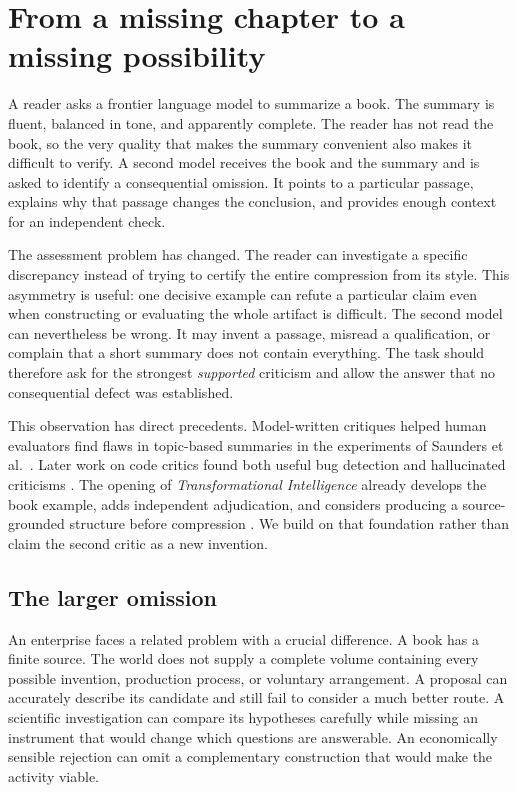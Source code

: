 \section{From a missing chapter to a missing possibility}
\label{sec:opening}
A reader asks a frontier language model to summarize a book. The summary is fluent, balanced in tone, and apparently complete. The reader has not read the book, so the very quality that makes the summary convenient also makes it difficult to verify. A second model receives the book and the summary and is asked to identify a consequential omission. It points to a particular passage, explains why that passage changes the conclusion, and provides enough context for an independent check.

The assessment problem has changed. The reader can investigate a specific discrepancy instead of trying to certify the entire compression from its style. This asymmetry is useful: one decisive example can refute a particular claim even when constructing or evaluating the whole artifact is difficult. The second model can nevertheless be wrong. It may invent a passage, misread a qualification, or complain that a short summary does not contain everything. The task should therefore ask for the strongest \emph{supported} criticism and allow the answer that no consequential defect was established.

This observation has direct precedents. Model-written critiques helped human evaluators find flaws in topic-based summaries in the experiments of Saunders et al.\ \citep{saunders}. Later work on code critics found both useful bug detection and hallucinated criticisms \citep{critic}. The opening of \emph{Transformational Intelligence} already develops the book example, adds independent adjudication, and considers producing a source-grounded structure before compression \citep[\S1 and Appendix C]{boucher_ti}. We build on that foundation rather than claim the second critic as a new invention.

\subsection{The larger omission}
An enterprise faces a related problem with a crucial difference. A book has a finite source. The world does not supply a complete volume containing every possible invention, production process, or voluntary arrangement. A proposal can accurately describe its candidate and still fail to consider a much better route. A scientific investigation can compare its hypotheses carefully while missing an instrument that would change which questions are answerable. An economically sensible rejection can omit a complementary construction that would make the activity viable.

